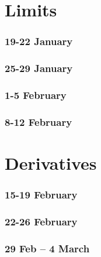 \documentclass[12pt]{beamer}
\theoremstyle{plain}
\theoremstyle{definition}
\begin{document}

\part{Limits}
\section[Week 1]{19-22 January}




\section[Week 2]{25-29 January}





\section[Week 3]{1-5 February}





\section[Week 4]{8-12 February}




\part{Derivatives}

\section[Week 5]{15-19 February}




\section[Week 6]{22-26 February}




\section[Week 7]{29 Feb -- 4 March}
\end{document}
